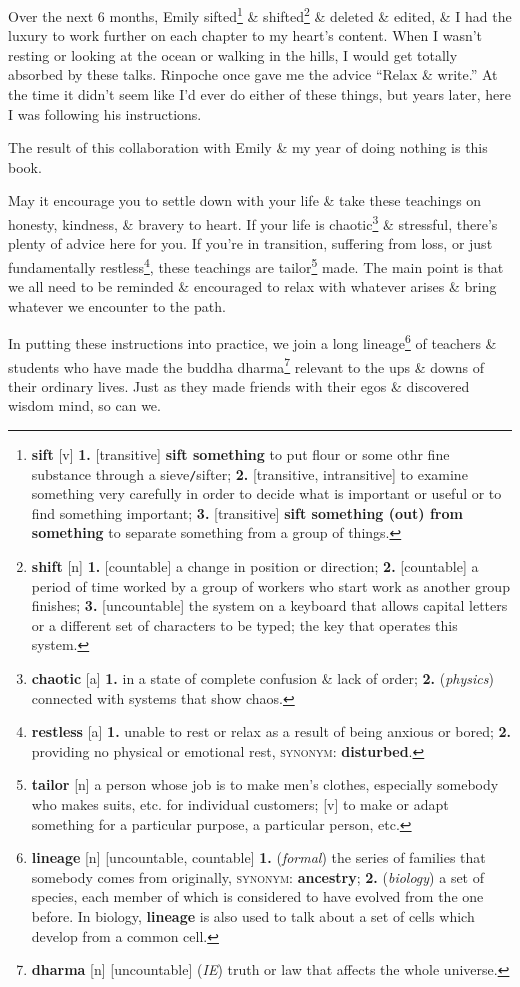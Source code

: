 \documentclass[oneside]{book}
\numberwithin{equation}{section}
\begin{document}
Over the next 6 months, Emily sifted\footnote{\textbf{sift} [v] \textbf{1.} [transitive] \textbf{sift something} to put flour or some othr fine substance through a sieve\texttt{/}sifter; \textbf{2.} [transitive, intransitive] to examine something very carefully in order to decide what is important or useful or to find something important; \textbf{3.} [transitive] \textbf{sift something (out) from something} to separate something from a group of things.} \& shifted\footnote{\textbf{shift} [n] \textbf{1.} [countable] a change in position or direction; \textbf{2.} [countable] a period of time worked by a group of workers who start work as another group finishes; \textbf{3.} [uncountable] the system on a keyboard that allows capital letters or a different set of characters to be typed; the key that operates this system.} \& deleted \& edited, \& I had the luxury to work further on each chapter to my heart's content. When I wasn't resting or looking at the ocean or walking in the hills, I would get totally absorbed by these talks. Rinpoche once gave me the advice ``Relax \& write.'' At the time it didn't seem like I'd ever do either of these things, but years later, here I was following his instructions.

The result of this collaboration with Emily \& my year of doing nothing is this book.

May it encourage you to settle down with your life \& take these teachings on honesty, kindness, \& bravery to heart. If your life is chaotic\footnote{\textbf{chaotic} [a] \textbf{1.} in a state of complete confusion \& lack of order; \textbf{2.} (\textit{physics}) connected with systems that show chaos.} \& stressful, there's plenty of advice here for you. If you're in transition, suffering from loss, or just fundamentally restless\footnote{\textbf{restless} [a] \textbf{1.} unable to rest or relax as a result of being anxious or bored; \textbf{2.} providing no physical or emotional rest, \textsc{synonym}: \textbf{disturbed}.}, these teachings are tailor\footnote{\textbf{tailor} [n] a person whose job is to make men's clothes, especially somebody who makes suits, etc. for individual customers; [v] to make or adapt something for a particular purpose, a particular person, etc.} made. The main point is that we all need to be reminded \& encouraged to relax with whatever arises \& bring whatever we encounter to the path.

In putting these instructions into practice, we join a long lineage\footnote{\textbf{lineage} [n] [uncountable, countable] \textbf{1.} (\textit{formal}) the series of families that somebody comes from originally, \textsc{synonym}: \textbf{ancestry}; \textbf{2.} (\textit{biology}) a set of species, each member of which is considered to have evolved from the one before. In biology, \textbf{lineage} is also used to talk about a set of cells which develop from a common cell.} of teachers \& students who have made the buddha dharma\footnote{\textbf{dharma} [n] [uncountable] (\textit{IE}) truth or law that affects the whole universe.} relevant to the ups \& downs of their ordinary lives. Just as they made friends with their egos \& discovered wisdom mind, so can we.
\end{document}
